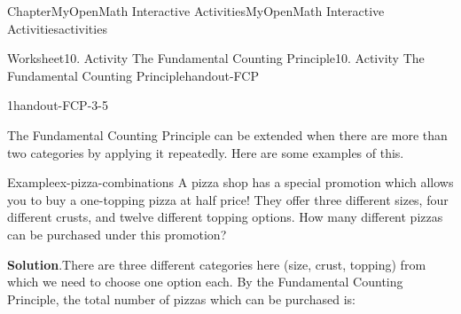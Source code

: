 \documentclass[oneside,10pt,]{book}
\newcommand{\blocktitlefont}{\relax}
\newcommand{\ptxlistdisc}{\raisebox{0.3ex}{\textbullet}}
\newlength{\fillinmaxwidth}
\newlength{\fillincontract}
\newlength{\charmaxwidth}\setlength{\charmaxwidth}{0.5em}
\newlength{\charminwidth}\setlength{\charminwidth}{0.1em}
\newlength{\fillinheight}
\newcommand{\fillintext}[1]{%
\setlength{\fillinmaxwidth}{#1\charmaxwidth}%
\setlength{\fillincontract}{#1\charminwidth}%
\setlength{\fillinheight}{\baselineskip}\addtolength{\fillinheight}{1.2pt}%
\strut\nobreak\leaders\vbox{\hrule width 0.3pt height 0.3pt \vskip -1.2pt}\hskip 1\fillinmaxwidth minus \fillincontract\nobreak\strut%
}
\begin{document}
\begin{chapterptx}{Chapter}{MyOpenMath Interactive Activities}{}{MyOpenMath Interactive Activities}{}{}{activities}
\begin{worksheet-section}{Worksheet}{10. Activity The Fundamental Counting Principle}{}{10. Activity The Fundamental Counting Principle}{}{}{handout-FCP}
\begin{divisionexercise}{1}{}{}{handout-FCP-3-5}
%
\end{divisionexercise}%
\clearpage
{}%
\clearpage
The Fundamental Counting Principle can be extended when there are more than two categories by applying it repeatedly. Here are some examples of this.%
\begin{example}{Example}{}{ex-pizza-combinations}%
A pizza shop has a special promotion which allows you to buy a one-topping pizza at half price! They offer three different sizes, four different crusts, and twelve different topping options. How many different pizzas can be purchased under this promotion?%
\par\smallskip%
\noindent\textbf{\blocktitlefont Solution}.\hypertarget{ex-pizza-combinations-2}{}\quad{}There are three different categories here (size, crust, topping) from which we need to choose one option each. By the Fundamental Counting Principle, the total number of pizzas which can be purchased is:%
\begin{equation*}

\end{equation*}
\end{example}
\end{worksheet-section}
\end{chapterptx}
\end{document}
